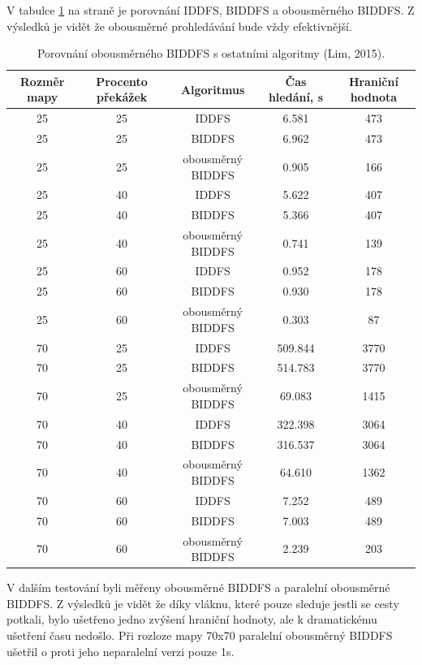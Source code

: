\documentclass[12pt]{report}
\begin{document}
	
	V tabulce \ref{tab:bd-biddfs} na straně \pageref{tab:bd-biddfs} je porovnání IDDFS, BIDDFS a obousměrného BIDDFS. Z výsledků je vidět že obousměrné prohledávání bude vždy efektivnější.
	
\begin{table}[h]
	\centering
	\begin{tabular}{c|c|c|c|c}
		\hline
		Rozměr mapy & Procento překážek & Algoritmus & Čas hledání, s & Hraniční hodnota \\
		\hline
		25 & 25 & IDDFS & 6.581 & 473\\
		25 & 25 & BIDDFS & 6.962 & 473\\
		25 & 25 & obousměrný BIDDFS & 0.905 & 166\\
		\hline
		25 & 40 & IDDFS & 5.622 & 407\\
		25 & 40 & BIDDFS & 5.366 & 407\\
		25 & 40 & obousměrný BIDDFS & 0.741 & 139\\
		\hline
		25 & 60 & IDDFS & 0.952 & 178\\
		25 & 60 & BIDDFS & 0.930 & 178\\
		25 & 60 & obousměrný BIDDFS & 0.303 & 87\\
		\hline
		70 & 25 & IDDFS & 509.844 & 3770\\
		70 & 25 & BIDDFS & 514.783 & 3770\\
		70 & 25 & obousměrný BIDDFS & 69.083 & 1415\\
		\hline
		70 & 40 & IDDFS & 322.398 & 3064\\
		70 & 40 & BIDDFS & 316.537 & 3064\\
		70 & 40 & obousměrný BIDDFS & 64.610 & 1362\\
		\hline
		70 & 60 & IDDFS & 7.252 & 489\\
		70 & 60 & BIDDFS & 7.003 & 489\\
		70 & 60 & obousměrný BIDDFS & 2.239 & 203\\
		\hline
	\end{tabular}
	\caption{Porovnání obousměrného BIDDFS s ostatními algoritmy (Lim, 2015).}
	\label{tab:bd-biddfs}
\end{table}

	V dalším testování byli měřeny obousměrné BIDDFS a paralelní obousměrné BIDDFS. Z výsledků je vidět že díky vláknu, které pouze sleduje jestli se cesty potkali, bylo ušetřeno jedno zvýšení hraniční hodnoty, ale k dramatickému ušetření času nedošlo. Při rozloze mapy 70x70 paralelní obousměrný BIDDFS ušetřil o proti jeho neparalelní verzi pouze 1s.
\end{document}
